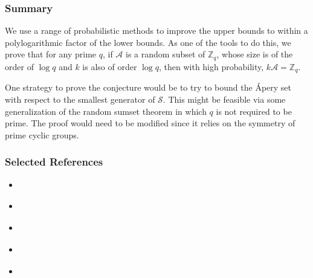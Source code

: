 \documentclass{beamer}
\def\ZZ{\ensuremath{\mathbb{Z}}}
\begin{document}
\begin{frame}
    \frametitle{Summary}
    We use a range of probabilistic methods to improve the upper bounds to within a polylogarithmic factor of the lower bounds. As one of the tools to do this, we prove that for any prime $q$, if $\mathcal{A}$ is a random subset of $\ZZ_q$, whose size is of the order of $\log q$ and $k$ is also of order $\log q$, then with high probability, $k\mathcal{A} = \ZZ_q$. \par
    One strategy to prove the conjecture would be to try to bound the Ápery set with respect to the smallest generator of $\mathcal{S}$. This might be feasible via some generalization of the random sumset theorem in which $q$ is not required to be prime. The proof would need to be modified since it relies on the symmetry of prime cyclic groups.  
\end{frame}



\begin{frame}
\frametitle{Selected References}
\begin{itemize}
    \item \footnotesize{
        }
    
    \item \footnotesize{
    }
    \item \footnotesize {
    }

    \item \footnotesize{
    }

    \item \footnotesize{
    }
    
\end{itemize}

\end{frame}


\end{document}
